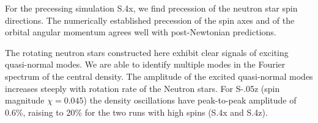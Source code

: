 \documentclass[aps,prd,amsmath,floatfix
,twocolumn
,superscriptaddress,nofootinbib,showpacs]{revtex4-1}
\theoremstyle{plain} \newtheorem{thm}{Theorem} \newtheorem{lem}{Lemma}
\begin{document}

For the precessing simulation S.4x, we find precession of the neutron
star spin directions.  The numerically established precession of the
spin axes and of the orbital angular momentum agrees well with
post-Newtonian predictions.


The rotating neutron stars constructed here exhibit clear signals of
exciting quasi-normal modes.  We are able to identify multiple modes
in the Fourier spectrum of the central density.  The amplitude of the
excited quasi-normal modes increases steeply with rotation rate of the
Neutron stars.  For S-.05z (spin magnitude $\chi=0.045$) the density
oscillations have peak-to-peak amplitude of 0.6\%, raising to 20\% for
the two runs with high spins (S.4x and S.4z).  

\end{document}
